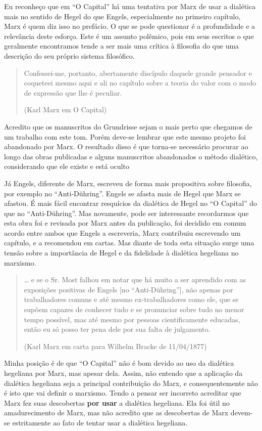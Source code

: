 Eu reconheço que em “O Capital” há uma tentativa por Marx de usar a dialética mais no sentido de Hegel do que Engels, especialmente no primeiro capítulo, Marx é quem diz isso no prefácio. O que se pode questionar é a profundidade e a relevância deste esforço. Este é um assunto polêmico, pois em seus escritos o que geralmente encontramos tende a ser mais uma crítica à filosofia do que uma descrição do seu próprio sistema filosófico.

\begin{quote}
Confessei-me, portanto, abertamente discípulo daquele grande pensador e coqueteei mesmo aqui e ali no capítulo sobre a teoria do valor com o modo de expressão que lhe é peculiar.

(Karl Marx em O Capital)
\end{quote}

Acredito que os manuscritos do Grundrisse sejam o mais perto que chegamos de um trabalho com este tom. Porém deve-se lembrar que este mesmo projeto foi abandonado por Marx. O resultado disso é que torna-se necessário procurar ao longo das obras publicadas e alguns manuscritos abandonados o método dialético, considerando que ele existe e está oculto

Já Engels, diferente de Marx, escreveu de forma mais propositiva sobre filosofia, por exemplo no “Anti-Dühring”. Engels se afasta mais de Hegel que Marx se afastou. É mais fácil encontrar resquícios da dialética de Hegel no “O Capital” do que no “Anti-Dühring”. Mas novamente, pode ser interessante recordarmos que esta obra foi e revisada por Marx antes da publicação, foi decidido em comum acordo entre ambos que Engels a escreveria, Marx contribuiu escrevendo um capítulo, e a recomendou em cartas. Mas diante de toda esta situação surge uma tensão sobre a importância de Hegel e da fidelidade à dialética hegeliana no marxismo.

\begin{quote}
… e se o Sr. Most falhou em notar que há muito a ser aprendido com as exposições positivas de Engels [no “Anti-Dühring”], não apenas por trabalhadores comuns e até mesmo ex-trabalhadores como ele, que se supõem capazes de conhecer tudo e se pronunciar sobre tudo no menor tempo possível, mas até mesmo por pessoas cientificamente educadas, então eu só posso ter pena dele por sua falta de julgamento.

(Karl Marx em carta para Wilhelm Bracke de 11/04/1877)
\end{quote}

Minha posição é de que “O Capital” não é bom devido ao uso da dialética hegeliana por Marx, mas apesar dela. Assim, não entendo que a aplicação da dialética hegeliana seja a principal contribuição do Marx, e consequentemente não é isto que vai definir o marxismo. Tendo a pensar ser incorreto acreditar que Marx fez suas descobertas \textbf{por usar} a dialética hegeliana. Ela foi útil no amadurecimento de Marx, mas não acredito que as descobertas de Marx devem-se estritamente ao fato de tentar usar a dialética hegeliana.

